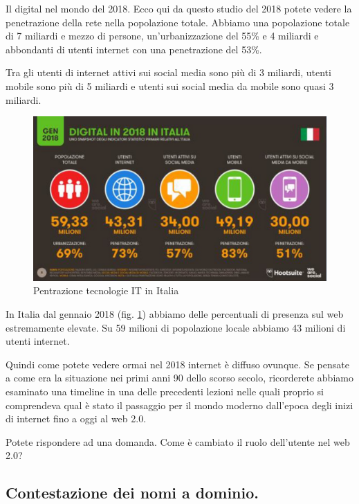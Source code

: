 Il digital nel mondo del 2018. Ecco qui da questo studio del 2018  potete vedere la penetrazione della rete nella popolazione totale. Abbiamo una popolazione totale di 7 miliardi e mezzo di persone, un'urbanizzazione del 55\% e 4 miliardi e abbondanti di utenti internet con una penetrazione del 53\%. \par
Tra gli utenti di internet attivi sui social media sono più di 3 miliardi, utenti mobile sono più di 5 miliardi e utenti sui social media da mobile sono quasi 3 miliardi. \par

\begin{figure}[ht]
    \centering
    \includegraphics[width=0.9\linewidth]{images/06_lez_fig_03.jpg}
    \caption{Pentrazione tecnologie IT in Italia}
    \label{fig:pentrazione_in_Italia}
\end{figure}

In Italia dal gennaio 2018 (fig. \ref{fig:pentrazione_in_Italia}) abbiamo delle percentuali di presenza sul web estremamente elevate. Su 59 milioni di popolazione locale abbiamo 43 milioni di utenti internet. 

Quindi come potete vedere ormai nel 2018 internet è diffuso ovunque. Se pensate a come era la situazione nei primi anni 90 dello scorso secolo, ricorderete abbiamo esaminato una timeline in una delle precedenti lezioni nelle quali proprio si comprendeva qual è stato il passaggio per il mondo moderno dall'epoca degli inizi di internet fino a oggi al web 2.0.

Potete rispondere ad una domanda. Come è cambiato il ruolo dell'utente nel web 2.0?

\subsection{Contestazione dei nomi a dominio.}

